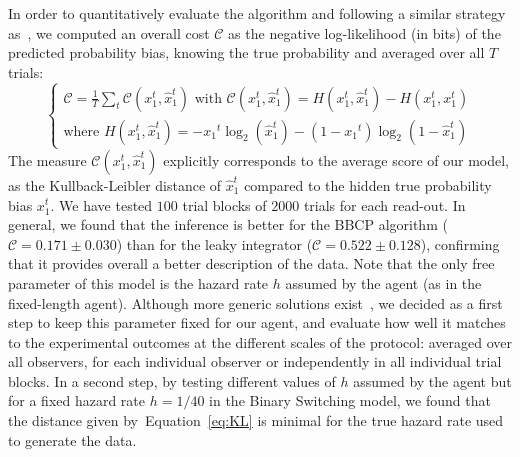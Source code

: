 \documentclass[10pt,letterpaper]{article}
\newcommand{\choice}[1]{ %
	\left\{ %
		\begin{array}{l} #1 \end{array} %
	\right. }
\newcommand{\eql}[1]{\begin{equation}#1\end{equation}}
\newcommand{\Cc}{\mathcal{C}}
\newcommand{\citep}[1]{\cite{#1}}
\newcommand{\citet}[1]{\cite{#1}}
\newcommand{\seeEq}[1]{Equation~\ref{eq:#1}}
\begin{document}
In order to quantitatively evaluate the algorithm and following a similar strategy as~\citet{Norton18},
we computed an overall cost $\Cc$ as the negative log-likelihood (in bits) of the predicted probability bias, knowing the true probability
and averaged over all $T$ trials:
\eql{
\choice{
 \Cc = \frac 1 T  \sum_t \Cc(x_1^t, \hat{x}_1^t)
 \text{ with }
 \Cc(x_1^t, \hat{x}_1^t) = H(x_1^t, \hat{x}_1^t ) - H(x_1^t, x_1^t ) \\
 \text{where } H(x_1^t, \hat{x}_1^t ) = - {x_1}^t \log_2( \hat{x}_1^t ) - (1-{x_1}^t) \log_2( 1- \hat{x}_1^t)
}
\label{eq:KL}
}
The measure $\Cc(x_1^t, \hat{x}_1^t)$ explicitly corresponds to the average score of our model,
as the Kullback-Leibler distance of $\hat{x}_1^t$ %
compared to the hidden true probability bias $x_1^t$.
We have tested $100$ trial blocks of $2000$ trials for each read-out.
In general, we found that the inference is better for the BBCP algorithm ($\Cc = 0.171 \pm 0.030$)
than for the leaky integrator ($\Cc = 0.522 \pm 0.128$), %
confirming that it provides overall a better description of the data.
Note that the only free parameter of this model is the hazard rate $h$
assumed by the agent (as in the fixed-length agent).
Although more generic solutions exist~\citep{Nassar10,Wilson13,Glaze15}, %
we decided as a first step to keep this parameter fixed for our agent,
and  evaluate how well it matches to the experimental outcomes at the different scales of the protocol:
averaged over all observers, for each individual observer or independently in all individual trial blocks.
In a second step, by testing different values of $h$ assumed by the agent
but for a fixed hazard rate $h=1/40$ in the Binary Switching model,
we found that the distance given by~\seeEq{KL} is minimal
for the true hazard rate used to generate the data.
\end{document}
